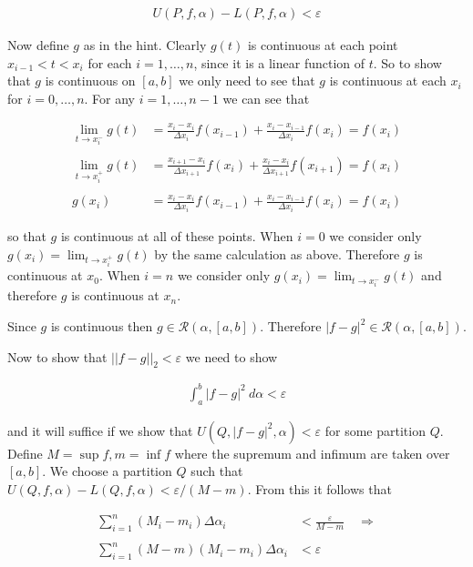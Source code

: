 \documentclass{article}
\begin{document}
  \begin{align*}
    U(P,f,\alpha)-L(P,f,\alpha)<\varepsilon
  \end{align*}

  Now define $g$ as in the hint.  Clearly $g(t)$ is continuous at each point $x_{i-1}<t<x_i$ for each $i=1, \dots, n$, since it is a linear function of $t$.  So to show that $g$ is continuous on $[a,b]$ we only need to see that $g$ is continuous at each $x_i$ for $i=0,\dots,n$.  For any $i=1,\dots,n-1$ we can see that

  \begin{align*}
    \lim_{t\to x_i^-}g(t) &= \frac{x_i-x_i}{\Delta x_i}f(x_{i-1})+\frac{x_i-x_{i-1}}{\Delta x_i}f(x_i)=f(x_i) \\\\
    \lim_{t\to x_i^+}g(t) &= \frac{x_{i+1}-x_i}{\Delta x_{i+1}}f(x_{i})+\frac{x_i-x_{i}}{\Delta x_{i+1}}f(x_{i+1})=f(x_i) \\\\
    g(x_i)&=\frac{x_i-x_i}{\Delta x_i}f(x_{i-1})+\frac{x_i-x_{i-1}}{\Delta x_i}f(x_i)=f(x_i)
  \end{align*}

  so that $g$ is continuous at all of these points.  When $i=0$ we consider only $g(x_i)=\displaystyle\lim_{t\to x_i^+}g(t)$ by the same calculation as above.  Therefore $g$ is continuous at $x_0$.  When $i=n$ we consider only $g(x_i)=\displaystyle\lim_{t\to x_i^-}g(t)$ and therefore $g$ is continuous at $x_n$.

  Since $g$ is continuous then $g\in\mathscr R(\alpha,[a,b])$.  Therefore $|f-g|^2\in\mathscr R(\alpha,[a,b])$.

  Now to show that $||f-g||_2<\varepsilon$ we need to show

  \begin{align*}
    \int_a^b |f-g|^2 \ d\alpha < \varepsilon
  \end{align*}

  and it will suffice if we show that $U(Q,|f-g|^2,\alpha)<\varepsilon$ for some partition $Q$.  Define $M=\sup f,m=\inf f$ where the supremum and infimum are taken over $[a,b]$. We choose a partition $Q$ such that $U(Q,f,\alpha)-L(Q,f,\alpha)<\varepsilon/(M-m)$.  From this it follows that 

  \begin{align*}
    \sum_{i=1}^n(M_i-m_i)\Delta\alpha_i &< \frac{\varepsilon}{M-m} \quad \Rightarrow \\\\
    \sum_{i=1}^n(M-m)(M_i-m_i)\Delta\alpha_i &< \varepsilon
  \end{align*}
\end{document}
